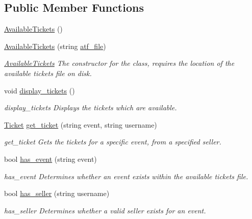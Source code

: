 \subsection*{Public Member Functions}
\begin{DoxyCompactItemize}
\item 
\hyperlink{class_available_tickets_a8fd5fda267fcc507006f3695acda4478}{Available\-Tickets} ()
\item 
\hyperlink{class_available_tickets_a89aa95cca16280fe08c3017c16731907}{Available\-Tickets} (string \hyperlink{class_available_tickets_ad677bc95025de980a4144bcf63e5b4ba}{atf\-\_\-file})
\begin{DoxyCompactList}\small\item\em \hyperlink{class_available_tickets}{Available\-Tickets} The constructor for the class, requires the location of the available tickets file on disk. \end{DoxyCompactList}\item 
void \hyperlink{class_available_tickets_a3cec8a2dd9682f54aaa1c3ea700e3ebf}{display\-\_\-tickets} ()
\begin{DoxyCompactList}\small\item\em display\-\_\-tickets Displays the tickets which are available. \end{DoxyCompactList}\item 
\hyperlink{class_ticket}{Ticket} \hyperlink{class_available_tickets_a9c8556ebea6f1ab303df799826e45e6f}{get\-\_\-ticket} (string event, string username)
\begin{DoxyCompactList}\small\item\em get\-\_\-ticket Gets the tickets for a specific event, from a specified seller. \end{DoxyCompactList}\item 
bool \hyperlink{class_available_tickets_a535e0bcb13e069687023bbc1aa30f77d}{has\-\_\-event} (string event)
\begin{DoxyCompactList}\small\item\em has\-\_\-event Determines whether an event exists within the available tickets file. \end{DoxyCompactList}\item 
bool \hyperlink{class_available_tickets_ad453b1f32a4c98dc793c56a95303bf93}{has\-\_\-seller} (string username)
\begin{DoxyCompactList}\small\item\em has\-\_\-seller Determines whether a valid seller exists for an event. \end{DoxyCompactList}\end{DoxyCompactItemize}
